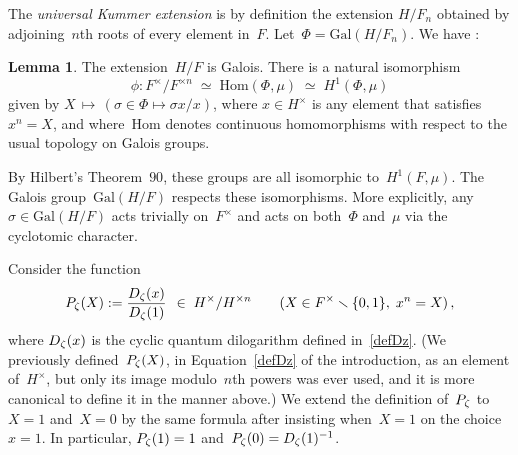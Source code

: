 \documentclass[12pt,reqno]{amsart}
\theoremstyle{definition}
\newtheorem{lemma}[theorem]{Lemma}
\newcommand{\changed}[1]{{#1}}
\newcommand{\frankchanged}[1]{{#1}}
\def\be{\begin{equation}}
\def\ee{\end{equation}}
\def\={\;=\;}
\def\ssm{\smallsetminus}
\def\nn{n}
\def\wD{D}  %
\def\Gal{\mathrm{Gal}}
\def\Hom{\mathrm{Hom}}
\begin{document}
The {\it universal Kummer extension} 
is by definition the extension $H/F_\nn$ obtained by adjoining~$\nn$th 
roots of every element in~$F$. Let~$\Phi = \Gal(H/F_\nn)$. 
We have \cite[Chpt.VI]{Lang:algebra}:

\begin{lemma}
\label{lemma:easy}
The extension~$H/F$ is Galois. There is a natural isomorphism
$$
\phi: F^{\times}/F^{\times \nn} 
\;\simeq\; \Hom(\Phi,\mu) \;\simeq\; H^1(\Phi,\mu)$$
given by $X \,\mapsto\, (\sigma \in \Phi \mapsto \sigma x/x)$,
where $x\in H^{\times}$ is any element that satisfies $x^\nn = X$,
\changed{and where~$\Hom$ denotes continuous homomorphisms with
respect to the usual topology on Galois groups.} \end{lemma}

\frankchanged{
By Hilbert's Theorem~$90$, these groups are all isomorphic to~$H^1(F,\mu)$.
The Galois group~$\Gal(H/F)$ respects these isomorphisms. More
explicitly, any~$\sigma \in \Gal(H/F)$  acts trivially on~$F^{\times}$ and acts on 
both~$\Phi$ and~$\mu$ via the cyclotomic character.}

 
Consider the function 
\be
\label{defRz2}
P_\z(X) := \changed{\frac{D_\z(x)}{D_{\z}(1)}} \;\,\in\;H^\times/H^{\times \nn}
  \qquad(X\in F^\times\ssm\{0,1\},\; x^\nn=X)\,, 
\ee
where $D_\zeta(x)$ is the cyclic quantum dilogarithm defined in~\eqref{defDz}. 
(We previously defined~$P_{\zeta}(X)$, in Equation~\eqref{defDz} of the 
introduction, as an element of~$H^{\times}$, but only its image modulo~$n$th 
powers was ever used, and it is more canonical to define it in the manner 
above.) \changed{We extend the definition of~$P_{\zeta}$ to~$X = 1$ and~$X = 0$ by the
same formula after insisting when~$X = 1$ on the choice~$x = 1$.
In particular, $P_{\zeta}(1) = 1$ and~$P_{\zeta}(0) = D_{\zeta}(1)^{-1}$.}
\end{document}
